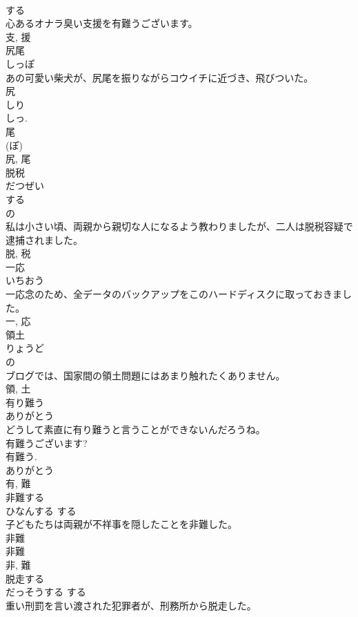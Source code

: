 \documentclass[8pt]{extreport}
\begin{document}
\begin{CJK}{UTF8}{min}
\\	する 
\\	心あるオナラ臭い支援を有難うございます。	
\\	支, 援	
\\	尻尾	
\\	しっぽ	
\\	あの可愛い柴犬が、尻尾を振りながらコウイチに近づき、飛びついた。	
\\	尻 
\\	しり 
\\	しっ. 
\\	尾 
\\	(ぽ) 
\\	尻, 尾	
\\	脱税	
\\	だつぜい	
\\	する 
\\	の 
\\	私は小さい頃、両親から親切な人になるよう教わりましたが、二人は脱税容疑で逮捕されました。	
\\	脱, 税	
\\	一応	
\\	いちおう	
\\	一応念のため、全データのバックアップをこのハードディスクに取っておきました。	
\\	一, 応	
\\	領土	
\\	りょうど	
\\	の 
\\	ブログでは、国家間の領土問題にはあまり触れたくありません。	
\\	領, 土	
\\	有り難う	
\\	ありがとう	
\\	どうして素直に有り難うと言うことができないんだろうね。	
\\	有難うございます? 
\\	有難う.	
\\	ありがとう 
\\	有, 難	
\\	非難する	
\\	ひなんする	する 
\\	子どもたちは両親が不祥事を隠したことを非難した。	
\\	非難 
\\	非難 
\\	非, 難	
\\	脱走する	
\\	だっそうする	する 
\\	重い刑罰を言い渡された犯罪者が、刑務所から脱走した。	

\end{CJK}
\end{document}
